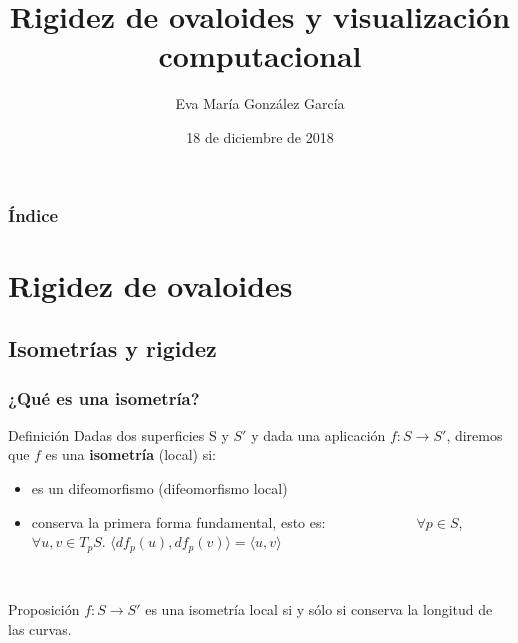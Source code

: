 \documentclass{beamer}
\title[Rigidez y Visualización]{Rigidez de ovaloides y visualización computacional}
\author{Eva María González García}
\date{18 de diciembre de 2018}
\institute[UGR]{Universidad de Granada}
\begin{document}
	
	
	\begin{frame}
		\maketitle
	\end{frame}
	
	\begin{frame}
		\frametitle{Índice}
		\tableofcontents
	\end{frame}
	
	
	\section{Rigidez de ovaloides}
	
	\subsection{Isometrías y rigidez}
	
	\begin{frame}
		\frametitle{¿Qué es una isometría?}
		\begin{block}{Definición}
			Dadas dos superficies S y $S'$ y dada una aplicación $f : S \longrightarrow S'$, diremos que $f$ es una \textbf{isometría} (local) si:
			\begin{itemize}
				\item es un difeomorfismo (difeomorfismo local)
				\item conserva la primera forma fundamental, esto es: $\;\;\;\;\;\;\;\;\;\;\;\;\;\;\;\;\;\;\;\;\;$ $\forall p \in S$, $\forall u,v \in T_p S$. $\langle df_p(u), df_p(v)\rangle = \langle u, v\rangle$
			\end{itemize}
		\end{block}
		${ }$\\
		\begin{block}{Proposición}
			$f : S \to S'$ es una isometría local si y sólo si conserva la longitud de las curvas.
		\end{block}
	\end{frame}
		
\end{document}
